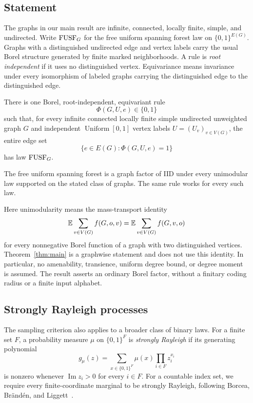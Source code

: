 \subsection{Statement}

The graphs in our main result are infinite, connected, locally finite, simple,
and undirected. Write $\mathrm{FUSF}_G$ for the free uniform spanning forest law on
$\{0,1\}^{E(G)}$. Graphs with a distinguished undirected edge and vertex
labels carry the usual Borel structure generated by finite marked
neighborhoods. A rule is \emph{root independent} if it uses no distinguished
vertex. Equivariance means invariance under every isomorphism of labeled
graphs carrying the distinguished edge to the distinguished edge.

\begin{theorem}\label{thm:main}
There is one Borel, root-independent, equivariant rule
\[
 \Phi(G,U,e)\in\{0,1\}
\]
such that, for every infinite connected locally finite simple undirected
unweighted graph $G$ and independent
$\operatorname{Uniform}[0,1]$ vertex labels $U=(U_v)_{v\in V(G)}$, the entire
edge set
\[
 \{e\in E(G):\Phi(G,U,e)=1\}
\]
has law $\mathrm{FUSF}_G$.
\end{theorem}

\begin{corollary}\label{cor:unimodular}
The free uniform spanning forest is a graph factor of IID under every
unimodular law supported on the stated class of graphs. The same rule works
for every such law.
\end{corollary}

Here unimodularity means the mass-transport identity
\[
 \mathbb E\sum_{v\in V(G)} f(G,o,v)
 =\mathbb E\sum_{v\in V(G)} f(G,v,o)
\]
for every nonnegative Borel function of a graph with two distinguished
vertices. Theorem~\ref{thm:main} is a graphwise statement and does not use
this identity. In particular, no amenability, transience, uniform degree
bound, or degree moment is assumed. The result asserts an ordinary Borel
factor, without a finitary coding radius or a finite input alphabet.

\subsection{Strongly Rayleigh processes}

The sampling criterion also applies to a broader class of binary laws.
For a finite set $F$, a probability measure $\mu$ on $\{0,1\}^F$ is
\emph{strongly Rayleigh} if its generating polynomial
\[
 g_\mu(z)=\sum_{x\in\{0,1\}^F}\mu(x)\prod_{i\in F}z_i^{x_i}
\]
is nonzero whenever $\operatorname{Im}z_i>0$ for every $i\in F$.
For a countable index set, we require every finite-coordinate marginal to
be strongly Rayleigh, following Borcea, Br\"and\'en, and
Liggett~\cite[Definition~2.13]{BorceaBrandenLiggett2009}.

